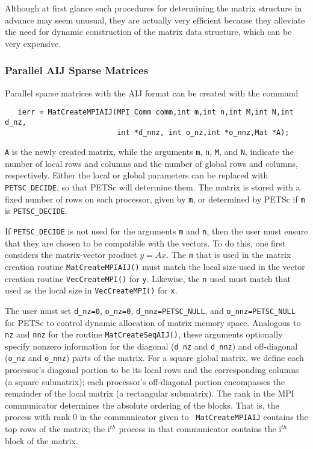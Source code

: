 Although at first glance such procedures for determining the matrix
structure in advance may seem unusual, they are actually very
efficient because they alleviate the need for dynamic
construction of the matrix data structure, which can be very
expensive.


\subsubsection{Parallel AIJ Sparse Matrices}

Parallel sparse matrices with the AIJ 
format can be created with the command 
\begin{verbatim}
   ierr = MatCreateMPIAIJ(MPI_Comm comm,int m,int n,int M,int N,int d_nz,
                          int *d_nnz, int o_nz,int *o_nnz,Mat *A);
\end{verbatim}
{\tt A} is the newly created matrix, while the arguments {\tt m}, {\tt n}, 
{\tt M}, and {\tt N}, indicate the number of local rows and columns and
the number of global rows and columns, respectively. Either the local or
global parameters can be replaced with {\tt PETSC\_DECIDE}, so that 
PETSc will determine  them.
The matrix is stored with a fixed number of rows on 
each processor, given by {\tt m}, or determined by PETSc if {\tt m} is
{\tt PETSC\_DECIDE}.

If {\tt PETSC\_DECIDE} is not used for the arguments
{\tt m} and {\tt n}, then the user must ensure that they are chosen to be
compatible with the vectors. To do this, one first considers the matrix-vector product 
$y = A x$. The {\tt m} that is used in the matrix creation routine {\tt MatCreateMPIAIJ()}
must match the local size used in the vector creation routine {\tt VecCreateMPI()} for {\tt y}.
Likewise, the {\tt n} used must match that used as the local size in 
{\tt VecCreateMPI()} for {\tt x}. 

The user must set {\tt d\_nz=0}, {\tt o\_nz=0}, {\tt d\_nnz=PETSC\_NULL}, and 
{\tt o\_nnz=PETSC\_NULL} for PETSc to control dynamic allocation of matrix
memory space.  Analogous to {\tt nz} and {\tt nnz} for the routine 
{\tt MatCreateSeqAIJ()}, these arguments optionally specify 
nonzero information for the diagonal ({\tt d\_nz} and {\tt d\_nnz}) and 
off-diagonal ({\tt o\_nz} and {\tt o\_nnz}) parts of the matrix. 
For a square global matrix, we define each processor's diagonal portion 
to be its local rows and the corresponding columns (a square submatrix);  
each processor's off-diagonal portion encompasses the remainder of the
local matrix (a rectangular submatrix).  
The rank in the MPI communicator determines the absolute ordering of the
blocks.  That is, the process with rank 0 in the communicator given to {\tt
  MatCreateMPIAIJ} contains the top rows of the matrix; the i$^{th}$ process
in that communicator contains the i$^{th}$ block of the matrix.

